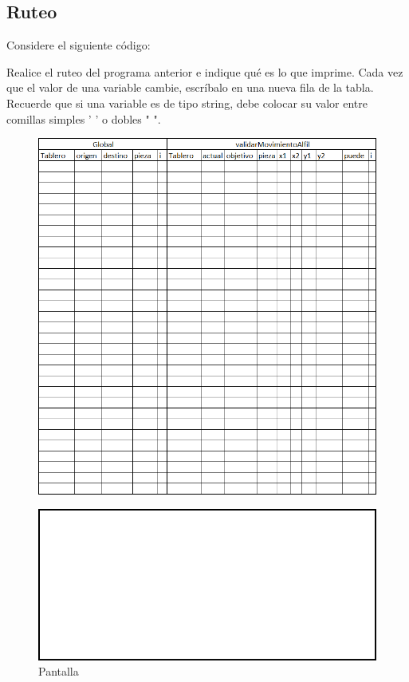 \subsection*{Ruteo}

Considere el siguiente código:




\newpage

Realice el ruteo del programa anterior e indique qué es lo que imprime. Cada vez que el valor de una variable cambie, escríbalo en una nueva fila de la tabla. Recuerde que si una variable es de tipo string, debe colocar su valor entre comillas simples ’ ’ o dobles " ".

\begin{figure}[H]
    \centering
    \includegraphics[width = 0.8 \textwidth]{Imagenes/tablaRuteo.png}
\end{figure}

\begin{figure}[H]
    \centering
    \includegraphics[width = 0.4 \textwidth]{Imagenes/consola.png}
    \caption{Pantalla}
\end{figure}
